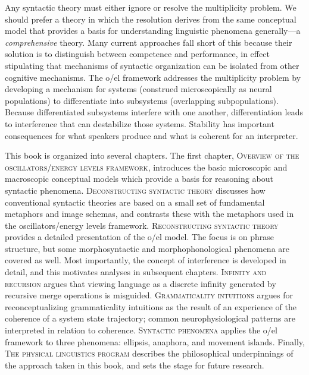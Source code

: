   Any syntactic theory must either ignore or resolve the multiplicity problem. We should prefer a theory in which the resolution derives from the same conceptual model that provides a basis for understanding linguistic phenomena generally—a \textit{comprehensive} theory. Many current approaches fall short of this because their solution is to distinguish between competence and performance, in effect stipulating that mechanisms of syntactic organization can be isolated from other cognitive mechanisms. The o/el framework addresses the multiplicity problem by developing a mechanism for systems (construed microscopically as neural populations) to differentiate into subsystems (overlapping subpopulations). Because differentiated subsystems interfere with one another, differentiation leads to interference that can destabilize those systems. Stability has important consequences for what speakers produce and what is coherent for an interpreter.

  This book is organized into several chapters. The first chapter, \textsc{Overview} \textsc{of} \textsc{the} \textsc{oscillators/energy} \textsc{levels} \textsc{framework}, introduces the basic microscopic and macroscopic conceptual models which provide a basis for reasoning about syntactic phenomena. \textsc{Deconstructing} \textsc{syntactic} \textsc{theory} discusses how conventional syntactic theories are based on a small set of fundamental metaphors and image schemas, and contrasts these with the metaphors used in the oscillators/energy levels framework. \textsc{Reconstructing} \textsc{syntactic} \textsc{theory} provides a detailed presentation of the o/el model. The focus is on phrase structure, but some morphosyntactic and morphophonological phenomena are covered as well. Most importantly, the concept of interference is developed in detail, and this motivates analyses in subsequent chapters. \textsc{Infinity} \textsc{and} \textsc{recursion} argues that viewing language as a discrete infinity generated by recursive merge operations is misguided. \textsc{Grammaticality} \textsc{intuitions} argues for reconceptualizing grammaticality intuitions as the result of an experience of the coherence of a system state trajectory; common neurophysiological patterns are interpreted in relation to coherence. \textsc{Syntactic} \textsc{phenomena} applies the o/el framework to three phenomena: ellipsis, anaphora, and movement islands. Finally, \textsc{The} \textsc{physical} \textsc{linguistics} \textsc{program} describes the philosophical underpinnings of the approach taken in this book, and sets the stage for future research.

